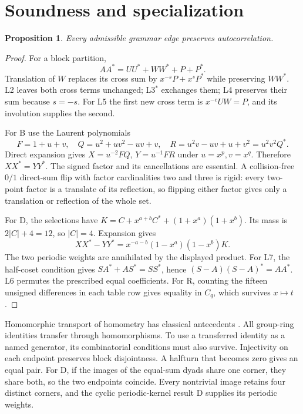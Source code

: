 \documentclass[11pt]{article}
\newtheorem{proposition}[theorem]{Proposition}
\theoremstyle{remark}
\begin{document}
\section{Soundness and specialization}
\begin{proposition}\label{prop:sound}
Every admissible grammar edge preserves autocorrelation.
\end{proposition}
\begin{proof}
For a block partition,
\[
 AA^*=UU^*+WW^*+P+P^*.
\]
Translation of $W$ replaces its cross sum by $x^{-s}P+x^sP^*$ while
preserving $WW^*$. L2 leaves both cross terms unchanged; L3$^*$ exchanges
them; L4 preserves their sum because $s=-s$. For L5 the first new cross
term is $x^{-c}UW=P$, and its involution supplies the second.

For B use the Laurent polynomials
\[
 F=1+u+v,\quad Q=u^2+uv^2-uv+v,\quad
 R=u^2v-uv+u+v^2=u^2v^2Q^*.
\]
Direct expansion gives $X=u^{-2}FQ$, $Y=u^{-1}FR$ under
$u=x^p,v=x^q$. Therefore $XX^*=YY^*$. The signed factor and its
cancellations are essential. A collision-free $0/1$ direct-sum flip
with factor cardinalities two and three is rigid: every two-point factor
is a translate of its reflection, so flipping either factor gives only
a translation or reflection of the whole set.

For D, the selections have
$K=C+x^{a+b}C^*+(1+x^a)(1+x^b)$. Its mass is $2|C|+4=12$,
so $|C|=4$. Expansion gives
\begin{equation}\label{eq:dyad}
 XX^*-YY^*=x^{-a-b}(1-x^a)(1-x^b)K.
\end{equation}
The two periodic weights are annihilated by the displayed product.
For L7, the half-coset condition gives $SA^*+AS^*=SS^*$, hence
$(S-A)(S-A)^*=AA^*$. L6 permutes the prescribed equal coefficients.
For R, counting the fifteen unsigned differences in each table row
gives equality in $C_q$, which survives $x\mapsto t$.
\end{proof}

Homomorphic transport of homometry has classical antecedents
\cite{mandereaua}. All group-ring identities transfer through homomorphisms. To use a
transferred identity as a named generator, its combinatorial conditions
must also survive. Injectivity on each endpoint preserves block disjointness.
A halfturn that becomes zero gives an equal pair. For D, if the images of
the equal-sum dyads share one corner, they share both, so the two endpoints
coincide. Every nontrivial image retains four distinct corners, and the
cyclic periodic-kernel result D supplies its periodic weights.
\end{document}
